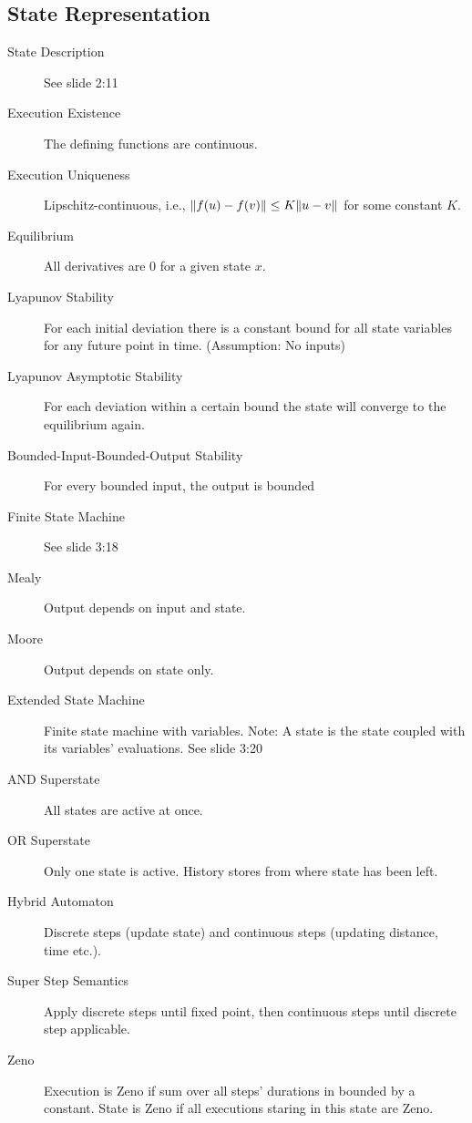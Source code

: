 
\subsection{State Representation}

\begin{description}
	\item[State Description] See slide 2:11
	\item[Execution Existence] The defining functions are continuous.
	\item[Execution Uniqueness] Lipschitz-continuous, i.e., $\Vert f(u) - f(v) \Vert 
	\leq K \Vert u - v \Vert$ for some constant $K$.
	\item[Equilibrium] All derivatives are 0 for a given state $x$.
	\item[Lyapunov Stability] For each initial deviation there is a constant 
	bound for all state variables for any future point in time. (Assumption: No
	inputs)
	\item[Lyapunov Asymptotic Stability] For each deviation within a certain bound
	the state will converge to the equilibrium again.
	\item[Bounded-Input-Bounded-Output Stability] For every bounded input, the output is bounded
	\item[Finite State Machine] See slide 3:18
	\item[Mealy] Output depends on input and state.
	\item[Moore] Output depends on state only.
	\item[Extended State Machine] Finite state machine with variables. Note: A
	state is the state coupled with its variables' evaluations. See slide 3:20
	\item[AND Superstate] All states are active at once.
	\item[OR Superstate] Only one state is active. History stores from where state
	has been left.
	\item[Hybrid Automaton] Discrete steps (\eg update state) and continuous steps
	(\eg updating distance, time etc.).
	\item[Super Step Semantics] Apply discrete steps until fixed point, then
	continuous steps until discrete step applicable.
	\item[Zeno] Execution is Zeno if sum over all steps' durations in bounded by a
	constant. State is Zeno if all executions staring in this state are Zeno.
\end{description}
